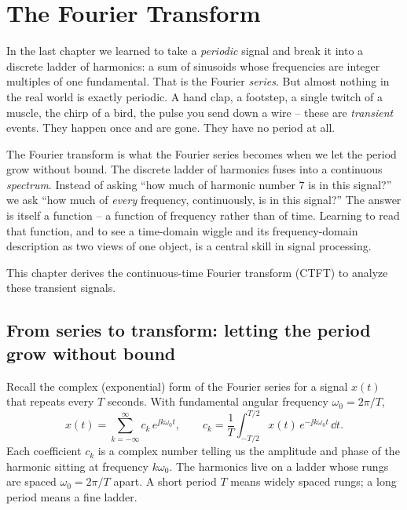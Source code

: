 \chapter{The Fourier Transform}

In the last chapter we learned to take a \emph{periodic} signal and break it into a
discrete ladder of harmonics: a sum of sinusoids whose frequencies are integer
multiples of one fundamental. That is the Fourier \emph{series}. But almost nothing
in the real world is exactly periodic. A hand clap, a footstep, a single twitch of a
muscle, the chirp of a bird, the pulse you send down a wire -- these are
\emph{transient} events. They happen once and are gone. They have no period at all.

The Fourier transform is what the Fourier series becomes when we let the period grow
without bound. The discrete ladder of harmonics fuses into a continuous \emph{spectrum}.
Instead of asking ``how much of harmonic number $7$ is in this signal?'' we ask ``how
much of \emph{every} frequency, continuously, is in this signal?'' The answer is itself
a function -- a function of frequency rather than of time. Learning to read that
function, and to see a time-domain wiggle and its frequency-domain description as two
views of one object, is a central skill in signal processing.

This chapter derives the continuous-time Fourier transform (CTFT) to analyze these transient signals.

\section{From series to transform: letting the period grow without bound}
\label{ch07:series-to-transform}

Recall the complex (exponential) form of the Fourier series for a signal $x(t)$ that
repeats every $T$ seconds. With fundamental angular frequency $\omega_0 = 2\pi/T$,
\begin{equation}
\label{ch07:fs-pair}
x(t) = \sum_{k=-\infty}^{\infty} c_k\, e^{\jj k \omega_0 t},
\qquad
c_k = \frac{1}{T}\int_{-T/2}^{T/2} x(t)\, e^{-\jj k \omega_0 t}\, \dd t .
\end{equation}
Each coefficient $c_k$ is a complex number telling us the amplitude and phase of the
harmonic sitting at frequency $k\omega_0$. The harmonics live on a ladder whose rungs
are spaced $\omega_0 = 2\pi/T$ apart. A short period $T$ means widely spaced rungs; a
long period means a fine ladder.

